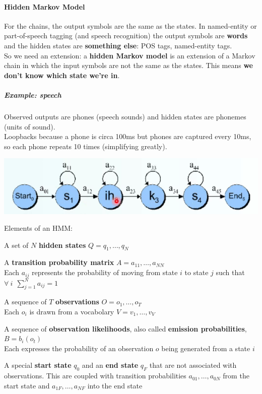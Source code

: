 \documentclass[10pt]{report}
\begin{document}
\paragraph{Hidden Markov Model} For the chains, the output symbols are the same as the states. In named-entity or part-of-speech tagging (and speech recognition) the output symbols are \textbf{words} and the hidden states are \textbf{something else}: POS tags, named-entity tags.\\
So we need an extension: a \textbf{hidden Markov model} is an extension of a Markov chain in which the input symbols are not the same as the states. This means \textbf{we don't know which state we're in}.
\subparagraph{Example: speech} Observed outputs are phones (speech sounds) and hidden states are phonemes (units of sound).\\
Loopbacks because a phone is circa 100ms but phones are captured every 10ms, so each phone repeats 10 times (simplifying greatly).
\begin{center}
	\includegraphics[scale=0.5]{14.png}
\end{center}
Elements of an HMM:
\begin{list}{}{}
	\item A set of $N$ \textbf{hidden states} $Q = q_1,\ldots,q_N$
	\item A \textbf{transition probability matrix} $A = a_{11},\ldots,a_{NN}$\\
	Each $a_{ij}$ represents the probability of moving from state $i$ to state $j$ such that $\forall\:i\:\:\sum_{j=1}^N a_{ij} = 1$
	\item A sequence of $T$ \textbf{observations} $O = o_1,\ldots,o_T$\\
	Each $o_i$ is drawn from a vocabolary $V = v_1,\ldots,v_V$
	\item A sequence of \textbf{observation likelihoods}, also called \textbf{emission probabilities}, $B = b_i(o_t)$\\
	Each expresses the probability of an observation $o$ being generated from a state $i$
	\item A special \textbf{start state} $q_0$ and an \textbf{end state} $q_F$ that are not associated with observations. This are coupled with transition probabilities $a_{01},\ldots,a_{0N}$ from the start state and $a_{1F},\ldots,a_{NF}$ into the end state
\end{list}
\end{document}
